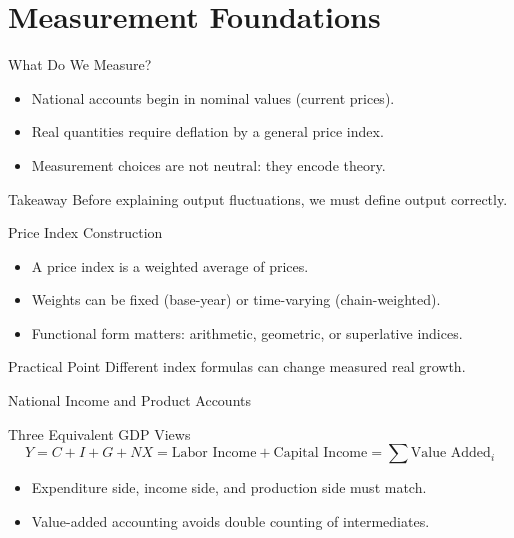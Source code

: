 \documentclass[aspectratio=169,10pt]{beamer}
\newcommand{\apxbutton}[1]{\hfill\hyperlink{#1}{\beamerbutton{Appendix}}}
\begin{document}
\section{Measurement Foundations}

\begin{frame}{What Do We Measure?}
\begin{itemize}
  \item National accounts begin in nominal values (current prices).
  \item Real quantities require deflation by a general price index.
  \item Measurement choices are not neutral: they encode theory.
\end{itemize}
\begin{block}{Takeaway}
Before explaining output fluctuations, we must define output correctly.
\end{block}
\end{frame}

\begin{frame}{Price Index Construction}
\hypertarget{main-price}{}
\begin{itemize}
  \item A price index is a weighted average of prices.
  \item Weights can be fixed (base-year) or time-varying (chain-weighted).
  \item Functional form matters: arithmetic, geometric, or superlative indices.
\end{itemize}
\begin{alertblock}{Practical Point}
Different index formulas can change measured real growth.
\end{alertblock}
\apxbutton{apx-cpi}
\end{frame}

\begin{frame}{National Income and Product Accounts}
\hypertarget{main-gdpid}{}
\begin{block}{Three Equivalent GDP Views}
\[
Y = C + I + G + NX = \text{Labor Income} + \text{Capital Income} = \sum \text{Value Added}_i
\]
\end{block}
\begin{itemize}
  \item Expenditure side, income side, and production side must match.
  \item Value-added accounting avoids double counting of intermediates.
\end{itemize}
\apxbutton{apx-valueadded}
\end{frame}
\end{document}
